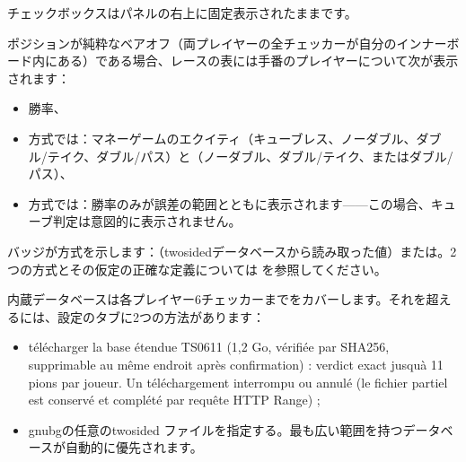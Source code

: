 \documentclass[letterpaper,10pt,dvipdfmx]{sphinxmanual}
\begin{document}
\sphinxAtStartPar
{}チェックボックスはパネルの右上に固定表示されたままです。

\sphinxAtStartPar
ポジションが純粋なベアオフ（両プレイヤーの全チェッカーが自分のインナーボード内にある）である場合、レースの表には手番のプレイヤーについて次が表示されます：
\begin{itemize}
\item {} 
\sphinxAtStartPar
勝率、

\item {} 
\sphinxAtStartPar
{}方式では：マネーゲームのエクイティ（キューブレス、ノーダブル、ダブル/テイク、ダブル/パス）と（ノーダブル、ダブル/テイク、またはダブル/パス）、

\item {} 
\sphinxAtStartPar
{}方式では：勝率のみが誤差の範囲とともに表示されます——この場合、キューブ判定は意図的に表示されません。

\end{itemize}

\sphinxAtStartPar
バッジが方式を示します：（two\sphinxhyphen{}sidedデータベースから読み取った値）または。2つの方式とその仮定の正確な定義については {\hyperref[\detokenize{manuel:epc-methodologie}]{}} を参照してください。

\sphinxAtStartPar
{} 内蔵データベースは各プレイヤー6チェッカーまでをカバーします。それを超えるには、設定のタブに2つの方法があります：
\begin{itemize}
\item {} 
\sphinxAtStartPar
télécharger la base étendue TS\sphinxhyphen{}06\sphinxhyphen{}11 (1,2 Go, vérifiée par SHA\sphinxhyphen{}256,
supprimable au même endroit après confirmation) : verdict exact jusqu\textquotesingle{}à
11 pions par joueur. Un téléchargement interrompu ou annulé  (le fichier partiel est conservé et complété par
requête HTTP Range) ;

\item {} 
\sphinxAtStartPar
gnubgの任意のtwo\sphinxhyphen{}sided  ファイルを指定する。最も広い範囲を持つデータベースが自動的に優先されます。

\end{itemize}
\end{document}
